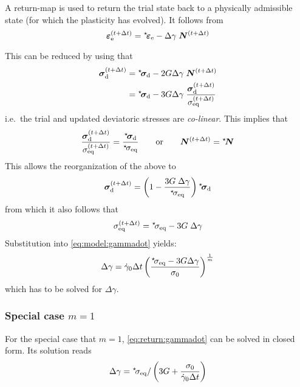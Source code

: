 \documentclass[times,namecite]{goose-article}
\newcommand\leftstar[1]{\hspace*{-.3em}~^\star\!#1}
\begin{document}
A return-map is used to return the trial state back to a physically admissible state (for which the plasticity has evolved). It follows from
\begin{equation}
\bm{\varepsilon}_\mathrm{e}^{(t+\Delta t)}
  = \leftstar\bm{\varepsilon}_\mathrm{e}
  - \Delta \gamma \; \bm{N}^{(t+\Delta t)}
\end{equation}

This can be reduced by using that
\begin{align}
  \bm{\sigma}_\mathrm{d}^{(t+\Delta t)}
  &= \leftstar{\bm{\sigma}}_\mathrm{d} - 2 G \Delta \gamma \; \bm{N}^{(t+\Delta t)}
  \\
  &= \leftstar{\bm{\sigma}}_\mathrm{d} - 3 G \Delta \gamma \;
   \frac{ \bm{\sigma}_\mathrm{d}^{(t+\Delta t)} }{ \sigma_\mathrm{eq}^{(t+\Delta t)} }
\end{align}
i.e.\ the trial and updated deviatoric stresses are \emph{co-linear}. This implies that
\begin{equation}
  \frac{ \bm{\sigma}_\mathrm{d}^{(t+\Delta t)} }{ \sigma_\mathrm{eq}^{(t+\Delta t)} }
  =
  \frac{ \leftstar{\bm{\sigma}}_\mathrm{d} }{ \leftstar{\sigma}_\mathrm{eq} }
  \qquad
  \mathrm{or}
  \qquad
  \bm{N}^{(t+\Delta t)} = \leftstar{\bm{N}}
\end{equation}
This allows the reorganization of the above to
\begin{equation}
  \bm{\sigma}_\mathrm{d}^{(t+\Delta t)}
  =
  \left(1 - \frac{ 3 G \; \Delta \gamma }{ \leftstar{\sigma}_\mathrm{eq} } \right)
  \leftstar{\bm{\sigma}}_\mathrm{d}
\end{equation}
from which it also follows that
\begin{equation}
  \sigma_\mathrm{eq}^{(t+\Delta t)} = \leftstar{\sigma}_\mathrm{eq} - 3 G \; \Delta \gamma
\end{equation}
Substitution into \eqref{eq:model:gammadot} yields:
\begin{equation}\label{eq:return:gammadot}
  \Delta \gamma
  =
  \dot{\gamma}_0 \Delta t \left(
    \frac{ \leftstar{\sigma_\mathrm{eq}} - 3 G \Delta \gamma }{ \sigma_0 }
  \right)^{\frac{1}{m}}
\end{equation}
which has to be solved for $\Delta \gamma$.

\subsubsection{Special case $m = 1$}

For the special case that $m = 1$, \eqref{eq:return:gammadot} can be solved in closed form. Its solution reads
\begin{equation}
\Delta \gamma =
\leftstar{\sigma}_\mathrm{eq} /
\left(
  3 G + \frac{\sigma_0}{\dot{\gamma}_0 \Delta t}
\right)
\end{equation}
\end{document}
